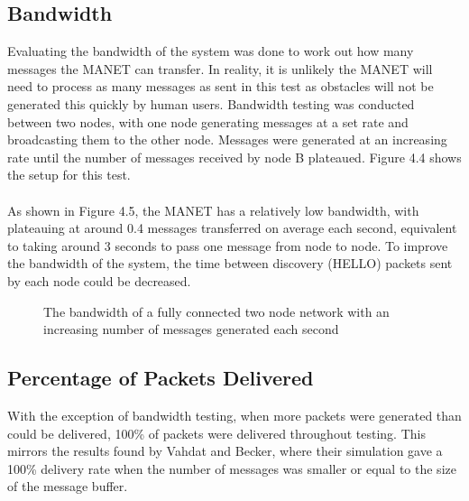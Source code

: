 \documentclass[12pt,a4paper]{report}
\makeatletter
\newenvironment{figurehere}
  {\def\@captype{figure}}
  {}
\makeatother
\begin{document}
\subsection{Bandwidth}
Evaluating the bandwidth of the system was done to work out how many messages the MANET can transfer. In reality, it is unlikely the MANET will need to process as many messages as sent in this test as obstacles will not be generated this quickly by human users. Bandwidth testing was conducted between two nodes, with one node generating messages at a set rate and broadcasting them to the other node. Messages were generated at an increasing rate until the number of messages received by node B plateaued. Figure 4.4 shows the setup for this test. \\ \\
As shown in Figure 4.5, the MANET has a relatively low bandwidth, with plateauing at around 0.4 messages transferred on average each second, equivalent to taking around 3 seconds to pass one message from node to node. To improve the bandwidth of the system, the time between discovery (HELLO) packets sent by each node could be decreased. 
\begin{figurehere}
\begin{center}
\end{center}
\caption{The network used for bandwidth testing}
\end{figurehere}
\begin{figure}[h]
\begin{center}

\end{center}
\caption{The bandwidth of a fully connected two node network with an increasing number of messages generated each second}
\end{figure}

\subsection{Percentage of Packets Delivered}
With the exception of bandwidth testing, when more packets were generated than could be delivered, 100\% of packets were delivered throughout testing. This mirrors the results found by Vahdat and Becker, where their simulation gave a 100\% delivery rate when the number of messages was smaller or equal to the size of the message buffer. \\
\end{document}

